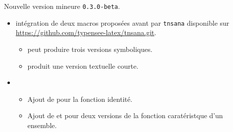 Nouvelle version mineure \verb+0.3.0-beta+.

\begin{itemize}[itemsep=.5em]
    \item {}
          intégration de deux macros proposées avant par \verb#tnsana# disponible sur \url{https://github.com/typensee-latex/tnsana.git}.

    \begin{itemize}[itemsep=.5em]
        \item {} peut produire trois versions symboliques.

        \item {} produit une version textuelle courte.
    \end{itemize}


    \item {}

    \begin{itemize}[itemsep=.5em]
        \item Ajout de  pour la fonction identité.

        \item Ajout de  et  pour deux versions de la fonction caratéristque d'un ensemble.
    \end{itemize}
\end{itemize}

\separation